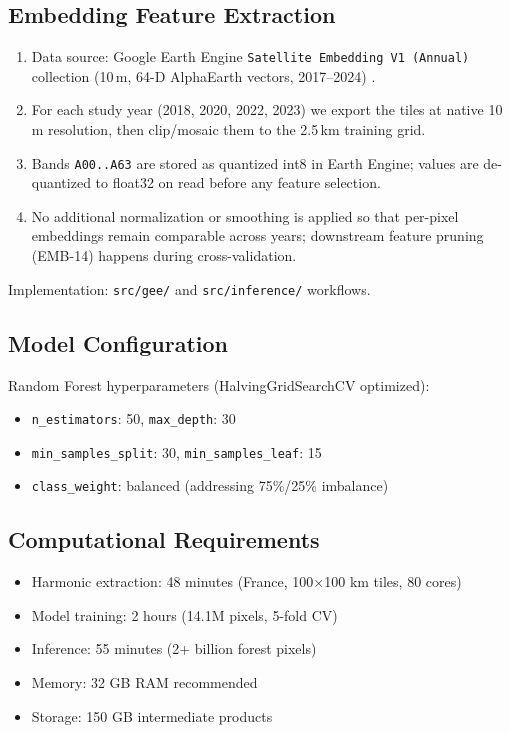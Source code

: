 \documentclass[utf8]{frontiers_suppmat}
\begin{document}
\subsection{Embedding Feature Extraction}
\begin{enumerate}
    \item Data source: Google Earth Engine \texttt{Satellite Embedding V1 (Annual)} collection (10\,m, 64-D AlphaEarth vectors, 2017--2024) \citep{Google2025SatelliteEmbeddingV1}.
    \item For each study year (2018, 2020, 2022, 2023) we export the tiles at native 10\,m resolution, then clip/mosaic them to the 2.5\,km training grid.
    \item Bands \texttt{A00..A63} are stored as quantized int8 in Earth Engine; values are de-quantized to float32 on read before any feature selection.
    \item No additional normalization or smoothing is applied so that per-pixel embeddings remain comparable across years; downstream feature pruning (EMB-14) happens during cross-validation.
\end{enumerate}
Implementation: \texttt{src/gee/} and \texttt{src/inference/} workflows.

\subsection{Model Configuration}
Random Forest hyperparameters (HalvingGridSearchCV optimized):
\begin{itemize}
    \item \texttt{n\_estimators}: 50, \texttt{max\_depth}: 30
    \item \texttt{min\_samples\_split}: 30, \texttt{min\_samples\_leaf}: 15
    \item \texttt{class\_weight}: balanced (addressing 75\%/25\% imbalance)
\end{itemize}

\subsection{Computational Requirements}
\begin{itemize}
    \item Harmonic extraction: 48 minutes (France, 100×100 km tiles, 80 cores)
    \item Model training: 2 hours (14.1M pixels, 5-fold CV)
    \item Inference: 55 minutes (2+ billion forest pixels)
    \item Memory: 32 GB RAM recommended
    \item Storage: 150 GB intermediate products
\end{itemize}
\end{document}
